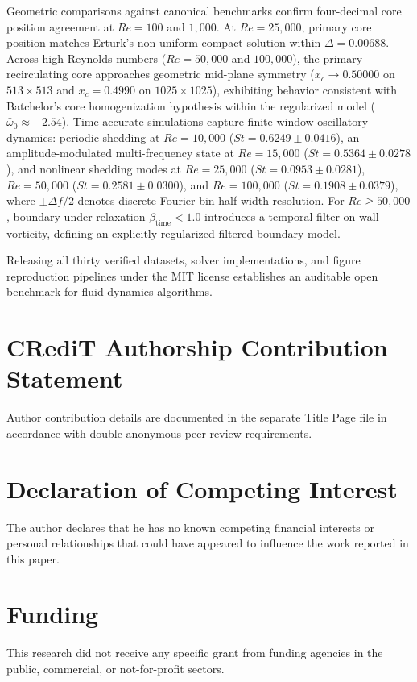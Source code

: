 \documentclass[11pt,a4paper]{article}
\begin{document}
Geometric comparisons against canonical benchmarks confirm four-decimal core position agreement at $Re = 100$ and $1{,}000$. At $Re = 25{,}000$, primary core position matches Erturk's non-uniform compact solution within $\Delta = 0.00688$. Across high Reynolds numbers ($Re = 50{,}000$ and $100{,}000$), the primary recirculating core approaches geometric mid-plane symmetry ($x_c \to 0.50000$ on $513 \times 513$ and $x_c = 0.4990$ on $1025 \times 1025$), exhibiting behavior consistent with Batchelor's core homogenization hypothesis within the regularized model ($\bar{\omega}_0 \approx -2.54$). Time-accurate simulations capture finite-window oscillatory dynamics: periodic shedding at $Re = 10{,}000$ ($St = 0.6249 \pm 0.0416$), an amplitude-modulated multi-frequency state at $Re = 15{,}000$ ($St = 0.5364 \pm 0.0278$), and nonlinear shedding modes at $Re = 25{,}000$ ($St = 0.0953 \pm 0.0281$), $Re = 50{,}000$ ($St = 0.2581 \pm 0.0300$), and $Re = 100{,}000$ ($St = 0.1908 \pm 0.0379$), where $\pm \Delta f / 2$ denotes discrete Fourier bin half-width resolution. For $Re \ge 50{,}000$, boundary under-relaxation $\beta_{\text{time}} < 1.0$ introduces a temporal filter on wall vorticity, defining an explicitly regularized filtered-boundary model.

Releasing all thirty verified datasets, solver implementations, and figure reproduction pipelines under the MIT license establishes an auditable open benchmark for fluid dynamics algorithms.

\section*{CRediT Authorship Contribution Statement}
Author contribution details are documented in the separate Title Page file in accordance with double-anonymous peer review requirements.

\section*{Declaration of Competing Interest}
The author declares that he has no known competing financial interests or personal relationships that could have appeared to influence the work reported in this paper.

\section*{Funding}
This research did not receive any specific grant from funding agencies in the public, commercial, or not-for-profit sectors.
\end{document}
